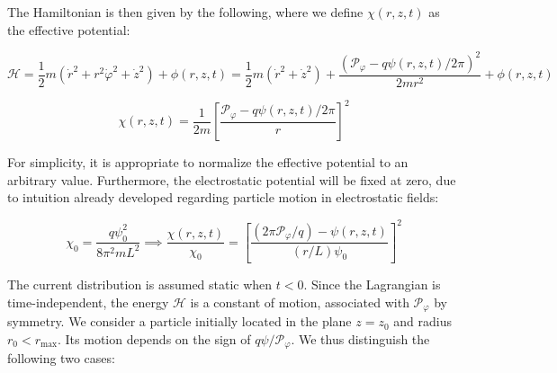 The Hamiltonian is then given by the following, where we define $\chi(r,z,t)$ as the effective potential:

\begin{equation}
    \mathcal{H}=\frac{1}{2}m\left(\dot{r}^2+r^2\dot{\varphi}^2+\dot{z}^2\right)+\phi(r,z,t)=\frac{1}{2}m(\dot{r}^2+\dot{z}^2)+\frac{(\mathcal{P}_\varphi-q\psi(r,z,t)/2\pi)^2}{2mr^2}+\phi(r,z,t)
\end{equation}

\begin{equation}
    \chi(r,z,t)=\frac{1}{2m}\left[\frac{\mathcal{P}_\varphi-q\psi(r,z,t)/2\pi}{r}\right]^2
\end{equation}

For simplicity, it is appropriate to normalize the effective potential to an arbitrary value. Furthermore, the electrostatic potential will be fixed at zero, due to intuition already developed regarding particle motion in electrostatic fields:

\begin{equation}
    \chi_0=\frac{q\psi_0^2}{8\pi^2mL^2}\implies\frac{\chi(r,z,t)}{\chi_0}=\left[\frac{(2\pi\mathcal{P}_\varphi/q)-\psi(r,z,t)}{(r/L)\psi_0}\right]^2
\end{equation}

The current distribution is assumed static when $t<0$. Since the Lagrangian is time-independent, the energy $\mathcal{H}$ is a constant of motion, associated with $\mathcal{P}_\varphi$ by symmetry.
We consider a particle initially located in the plane $z=z_0$ and radius $r_0<r_\text{max}$. Its motion depends on the sign of $q\psi/\mathcal{P}_\varphi$. We thus distinguish the following two cases:

